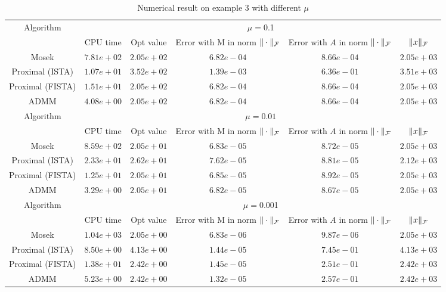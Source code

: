 \documentclass{article}
\begin{document}
	\begin{table}
		\centering
		\begin{tabular}{|c|c|c|c|c|c|}
		
		\hline
		\multirow{2}{*}{ Algorithm} &\multicolumn{5}{c|}{$\mu=$0.1}\\\cline{2-6}
		 &CPU time &Opt value &Error with M in norm $\|\cdot\|_\mathcal F$ &Error with $A$ in norm $\|\cdot\|_\mathcal F$ &$\|x\|_\mathcal F$\\\hline
		Mosek & $7.81e+02$ & $2.05e+02$ & $6.82e-04$ & $8.66e-04$ & $2.05e+03$\\\hline
		Proximal (ISTA) & $1.07e+01$ & $3.52e+02$ & $1.39e-03$ & $6.36e-01$ & $3.51e+03$\\\hline
		Proximal (FISTA) & $1.51e+01$ & $2.05e+02$ & $6.82e-04$ & $8.66e-04$ & $2.05e+03$\\\hline
		ADMM & $4.08e+00$ & $2.05e+02$ & $6.82e-04$ & $8.66e-04$ & $2.05e+03$\\\hline
		\multirow{2}{*}{ Algorithm} &\multicolumn{5}{c|}{$\mu=0.01$}\\\cline{2-6}
 &CPU time &Opt value &Error with M in norm $\|\cdot\|_\mathcal F$ &Error with $A$ in norm $\|\cdot\|_\mathcal F$ &$\|x\|_\mathcal F$\\\hline
		Mosek & $8.59e+02$ & $2.05e+01$ & $6.83e-05$ & $8.72e-05$ & $2.05e+03$\\\hline
Proximal (ISTA) & $2.33e+01$ & $2.62e+01$ & $7.62e-05$ & $8.81e-05$ & $2.12e+03$\\\hline
Proximal (FISTA) & $1.25e+01$ & $2.05e+01$ & $6.85e-05$ & $8.92e-05$ & $2.05e+03$\\\hline
ADMM & $3.29e+00$ & $2.05e+01$ & $6.82e-05$ & $8.67e-05$ & $2.05e+03$\\\hline
\multirow{2}{*}{ Algorithm} &\multicolumn{5}{c|}{$\mu=$0.001}\\\cline{2-6}
 &CPU time &Opt value &Error with M in norm $\|\cdot\|_\mathcal F$ &Error with $A$ in norm $\|\cdot\|_\mathcal F$ &$\|x\|_\mathcal F$\\\hline
Mosek & $1.04e+03$ & $2.05e+00$ & $6.83e-06$ & $9.87e-06$ & $2.05e+03$\\\hline
Proximal (ISTA) & $8.50e+00$ & $4.13e+00$ & $1.44e-05$ & $7.45e-01$ & $4.13e+03$\\\hline
Proximal (FISTA) & $1.38e+01$ & $2.42e+00$ & $1.45e-05$ & $2.51e-01$ & $2.42e+03$\\\hline
ADMM & $5.23e+00$ & $2.42e+00$ & $1.32e-05$ & $2.57e-01$ & $2.42e+03$\\\hline
		\end{tabular}
		\caption{Numerical result on example 3 with different $\mu$\label{example3}}
		\end{table}
		
\end{document}
